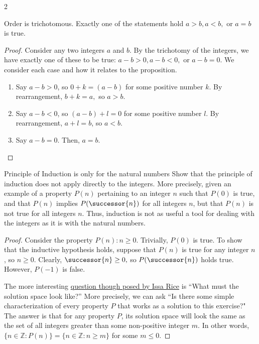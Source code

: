 \begin{multicols}{2}
\begin{proposition}
	Order is trichotomous. Exactly one of the statements hold $a > b, a < b, $ or $a = b$ is true.
\end{proposition}
\begin{proof}
	Consider any two integers $a$ and $b$. 
	By the trichotomy of the integers, we have exactly one of these to be true: 
	$a - b > 0, a - b < 0,$ or $ a - b = 0.$
	We consider each case and how it relates to the proposition.
	\begin{enumerate}
		\item Say $a - b > 0$, so $0 + k = (a - b)$ for some positive number $k$. 
		By rearrangement, $b + k = a,$ so $a > b.$ 
		\item Say $a - b < 0$, so $(a-b) + l = 0$ for some positive number $l$.
		By rearrangement, $a + l = b$, so $a < b.$
		\item Say $a - b = 0.$ Then, $a = b.$
	\end{enumerate}
\end{proof}
\end{multicols}

\begin{problem}{Principle of Induction is only for the natural numbers}
	Show that the principle of induction does not apply directly to the integers.
	More precisely, given an example of a property $P(n)$ pertaining to an integer $n$ such that $P(0)$ is true, and that $P(n)$ implies $P(\successor{n})$ for all integers $n$, but that $P(n)$ is not true for all integers $n$.
	Thus, induction is not as useful a tool for dealing with the integers as it is with the natural numbers.
\end{problem}
\begin{proof}
	Consider the property $P(n) : n \geq 0.$ 
	Trivially, $P(0)$ is true. 
	To show that the inductive hypothesis holds, suppose that $P(n)$ is true for any integer $n$, so $n \geq 0.$
	Clearly, $\successor{n} \geq 0,$ so $P(\successor{n})$ holds true.
	However, $P(-1)$ is false. 

	The more interesting \href{https://taoanalysis.wordpress.com/2020/03/22/exercise-4-1-8/}{question though posed by Issa Rice} is
	``What must the solution space look like?” 
	More precisely, we can ask ``Is there some simple characterization of every property $P$ that works as a solution to this exercise?"
	The answer is that for any property $P$, its solution space will look the same as the set of all integers greater than some non-positive integer $m.$
	In other words, $\{n \in \mathbb{Z} : P(n) \} = \{ n \in \mathbb{Z} : n \geq m \}$ for some $m \leq 0.$
\end{proof}